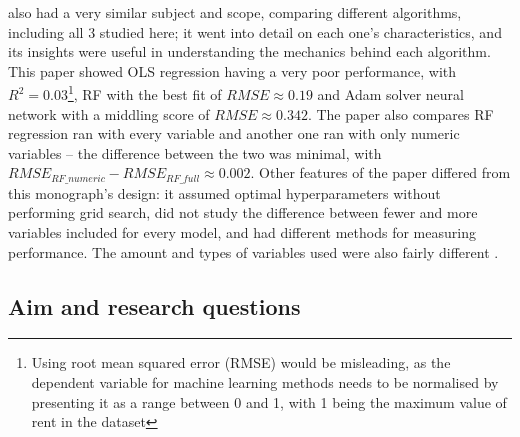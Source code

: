 \documentclass[12pt]{report}
\begin{document}
\cite{neloy2019} also had a very similar subject and scope, comparing different algorithms, including all 3 studied here; it went into detail on each one's characteristics, and its insights were useful in understanding the mechanics behind each algorithm. This paper showed OLS regression having a very poor performance, with $R^2=0.03$\footnote{Using root mean squared error (RMSE) would be misleading, as the dependent variable for machine learning methods needs to be normalised by presenting it as a range between 0 and 1, with 1 being the maximum value of rent in the dataset}, RF with the best fit of $RMSE\approx 0.19$ and Adam solver neural network with a middling score of $RMSE\approx 0.342$. The paper also compares RF regression ran with every variable and another one ran with only numeric variables -- the difference between the two was minimal, with $RMSE_{RF\_numeric}-RMSE_{RF\_full}\approx 0.002$. Other features of the paper differed from this monograph's design: it assumed optimal hyperparameters without performing grid search, did not study the difference between fewer and more variables included for every model, and had different methods for measuring performance. The amount and types of variables used were also fairly different \cite[p.352]{neloy2019}.

\subsection{Aim and research questions}
\end{document}
